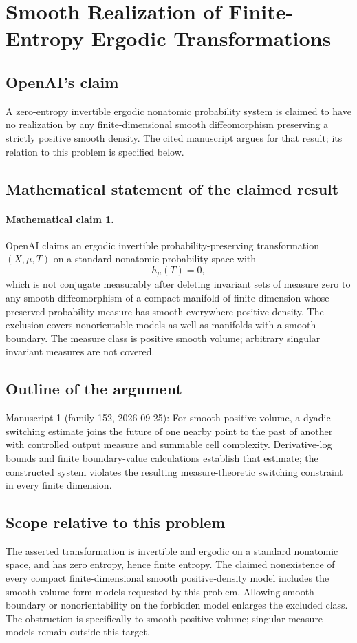 \documentclass[11pt]{article}
\begin{document}
\section*{Smooth Realization of Finite-Entropy Ergodic Transformations}

\subsection{OpenAI's claim}
A zero-entropy invertible ergodic nonatomic probability system is claimed to have no realization by any finite-dimensional smooth diffeomorphism preserving a strictly positive smooth density. The cited manuscript argues for that result; its relation to this problem is specified below.

\subsection{Mathematical statement of the claimed result}
\paragraph{Mathematical claim 1.} OpenAI claims an ergodic invertible probability-preserving transformation $(X,\mu,T)$ on a standard nonatomic probability space with
\[
h_\mu(T)=0,
\]
which is not conjugate measurably after deleting invariant sets of measure zero to any smooth diffeomorphism of a compact manifold of finite dimension whose preserved probability measure has smooth everywhere-positive density. The exclusion covers nonorientable models as well as manifolds with a smooth boundary. The measure class is positive smooth volume; arbitrary singular invariant measures are not covered.

\subsection{Outline of the argument}
Manuscript 1 (family 152, 2026-09-25): For smooth positive volume, a dyadic switching estimate joins the future of one nearby point to the past of another with controlled output measure and summable cell complexity. Derivative-log bounds and finite boundary-value calculations establish that estimate; the constructed system violates the resulting measure-theoretic switching constraint in every finite dimension.

\subsection{Scope relative to this problem}
The asserted transformation is invertible and ergodic on a standard nonatomic space, and has zero entropy, hence finite entropy. The claimed nonexistence of every compact finite-dimensional smooth positive-density model includes the smooth-volume-form models requested by this problem. Allowing smooth boundary or nonorientability on the forbidden model enlarges the excluded class. The obstruction is specifically to smooth positive volume; singular-measure models remain outside this target.
\end{document}
